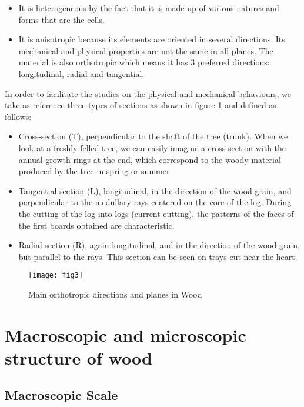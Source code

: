 \begin{itemize}
	\item It is heterogeneous by the fact that it is made up of various natures and forms that are the cells. 
	\item It is anisotropic because its elements are oriented in several directions. Its mechanical and physical properties are not the same in all planes. The material is also orthotropic which means it has 3 preferred directions: longitudinal, radial and tangential.
\end{itemize}

In order to facilitate the studies on the physical and mechanical behaviours, we take as reference three types of sections as shown in figure \ref{fig:fig3} and defined as follows:

\begin{itemize}
	\item Cross-section (T), perpendicular to the shaft of the tree (trunk). When we look at a freshly felled tree, we can easily imagine a cross-section with the annual growth rings at the end, which correspond to the woody material produced by the tree in spring or summer.
	\item Tangential section (L), longitudinal, in the direction of the wood grain, and perpendicular to the medullary rays centered on the core of the log. During the cutting of the log into logs (current cutting), the patterns of the faces of the first boards obtained are characteristic.
	\item Radial section (R), again longitudinal, and in the direction of the wood grain, but parallel
	to the rays. This section can be seen on trays cut near the heart.
\end{itemize}

\graphicspath{{Images/}}
\begin{figure}[htp]
	\centering
	\texttt{[image: fig3]}
	\caption{Main orthotropic directions and planes in Wood}
	\label{fig:fig3}
\end{figure}

\newpage

\section{Macroscopic and microscopic structure of wood}

\subsection{Macroscopic Scale}

